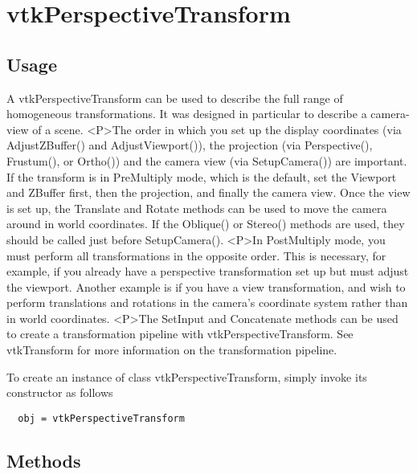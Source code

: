 \section{vtkPerspectiveTransform}

\subsection{Usage}

 A vtkPerspectiveTransform can be used to describe the full range of
 homogeneous transformations.  It was designed in particular
 to describe a camera-view of a scene.  
 <P>The order in which you set up the display coordinates (via 
 AdjustZBuffer() and AdjustViewport()), the projection (via Perspective(), 
 Frustum(), or Ortho()) and the camera view (via SetupCamera()) are
 important.  If the transform is in PreMultiply mode, which is the 
 default, set the Viewport and ZBuffer first, then the projection, and
 finally the camera view.  Once the view is set up, the Translate
 and Rotate methods can be used to move the camera around in world
 coordinates.  If the Oblique() or Stereo() methods are used, they 
 should be called just before SetupCamera().
 <P>In PostMultiply mode, you must perform all transformations
 in the opposite order.  This is necessary, for example, if you
 already have a perspective transformation set up but must adjust
 the viewport.  Another example is if you have a view transformation,
 and wish to perform translations and rotations in the camera's 
 coordinate system rather than in world coordinates.
 <P>The SetInput and Concatenate methods can be used to create 
 a transformation pipeline with vtkPerspectiveTransform.  See vtkTransform
 for more information on the transformation pipeline.

To create an instance of class vtkPerspectiveTransform, simply
invoke its constructor as follows
\begin{verbatim}
  obj = vtkPerspectiveTransform
\end{verbatim}
\subsection{Methods}

